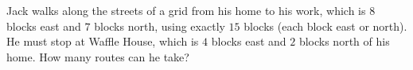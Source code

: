 Jack walks along the streets of a grid from his home to his work, which is $8$ blocks east and $7$ blocks north, using exactly $15$ blocks (each block east or north). He must stop at Waffle House, which is $4$ blocks east and $2$ blocks north of his home. How many routes can he take?
